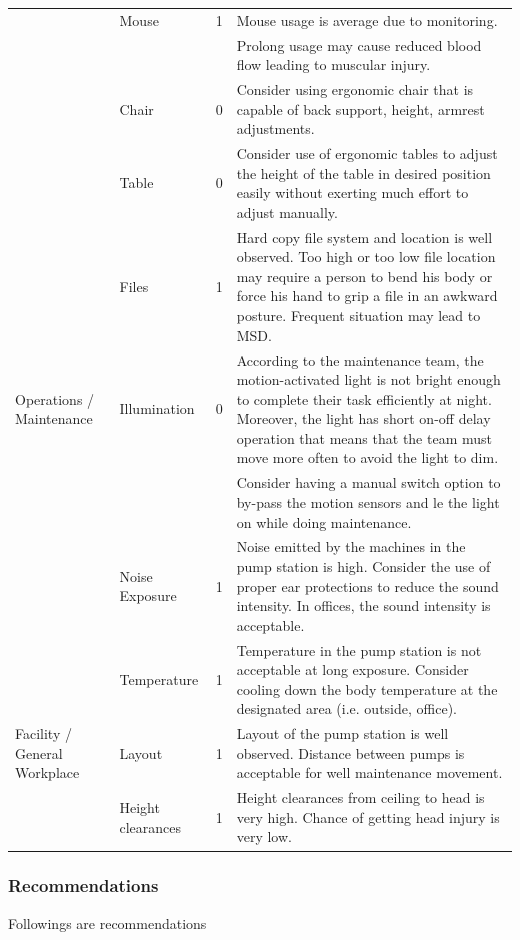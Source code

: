 \begin{table}[!htb]
{\begin{tabular}{p{2cm}|l|c|p{8cm}}
	& Mouse & 1 & Mouse usage is average due to monitoring. \\ 
	&  &  & Prolong usage may cause reduced blood flow leading to muscular injury. \\ 
	& Chair & 0 & Consider using ergonomic chair that is capable of back support, height, armrest adjustments. \\ 
	& Table & 0 & Consider use of ergonomic tables to adjust the height of the table in desired position easily without exerting much effort to adjust manually. \\ 
	& Files & 1 & Hard copy file system and location is well observed. Too high or too low file location may require a person to bend his body or force his hand to grip a file in an awkward posture. Frequent situation may lead to MSD. \\ 
	\hline
	Operations / Maintenance & Illumination & 0 & According to the maintenance team, the motion-activated light is not bright enough to complete their task efficiently at night. Moreover, the light has short on-off delay operation that means that the team must move more often to avoid the light to dim.  \\ 
	&  &  & Consider having a manual switch option to by-pass the motion sensors and le the light on while doing maintenance.  \\ 
	& Noise Exposure & 1 & Noise emitted by the machines in the pump station is high. Consider the use of proper ear protections to reduce the sound intensity. In offices, the sound intensity is acceptable.  \\ 
	& Temperature & 1 & Temperature in the pump station is not acceptable at long exposure. Consider cooling down the body temperature at the designated area (i.e. outside, office). \\ 
	\hline
	Facility / General Workplace & Layout & 1 & Layout of the pump station is well observed. Distance between pumps is acceptable for well maintenance movement.  \\ 
	& Height clearances & 1 & Height clearances from ceiling to head is very high. Chance of getting head injury is very low. \\ 
	\hline
\end{tabular}
	
	}
\end{table}



\subsubsection{Recommendations}
Followings are recommendations

